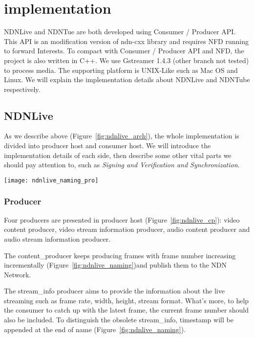 \section{implementation} %
\label{sec:implementation}
NDNLive and NDNTue are both developed using Consumer / Producer API. This API is an modification version of ndn-cxx library and requires NFD running to forward Interests. To compact with Consumer / Producer API and NFD, the project is also written in C++. We use Gstreamer 1.4.3 (other branch not tested) to process media. The supporting platform is UNIX-Like such as Mac OS and Linux. We will explain the implementation details about NDNLive and NDNTube respectively.

\subsection{NDNLive}
As we describe above (Figure~\ref{fig:ndnlive_arch}), the whole implementation is divided into producer host and consumer host. We will introduce the implementation details of each side, then describe some other vital parts we should pay attention to, such as \textit{Signing and Verification and Synchronization}. 

\begin{figure*}%
  \centering
  \texttt{[image: ndnlive\_naming\_pro]}
  \caption{NDNLive Producer and Consumer Structure}
  \label{fig:ndnlive_cp}
\end{figure*}

\subsubsection{Producer}
\label{ssub:ndnlive_pro}
Four producers are presented in producer host (Figure~\ref{fig:ndnlive_cp}): video content producer, video stream information producer, audio content producer and audio stream information producer. 

The content\_producer keeps producing frames with frame number increasing incrementally (Figure~\ref{fig:ndnlive_naming})and publish them to the NDN Network. 

The stream\_info producer aims to provide the information about the live streaming such as frame rate, width, height, stream format. What's more, to help the consumer to catch up with the latest frame, the current frame number should also be included. To distinguish the obsolete stream\_info, timestamp will be appended at the end of name (Figure~\ref{fig:ndnlive_naming}).

